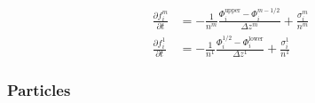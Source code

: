 \documentclass{article}
\begin{document}
\begin{align}
  \frac{\partial f_i^m}{\partial t} &= - \frac{1}{n^{m}} \frac{\Phi_{i}^\text{upper} - \Phi_{i}^{m-1/2}}{\Delta z^m} + \frac{\sigma_i^m}{n^{m}} \\
  \frac{\partial f_i^1}{\partial t} &= - \frac{1}{n^{1}} \frac{\Phi_{i}^\text{1/2} - \Phi_{i}^\text{lower}}{\Delta z^1} + \frac{\sigma_i^1}{n^{1}}
\end{align}

\subsubsection{Particles}














\end{document}
